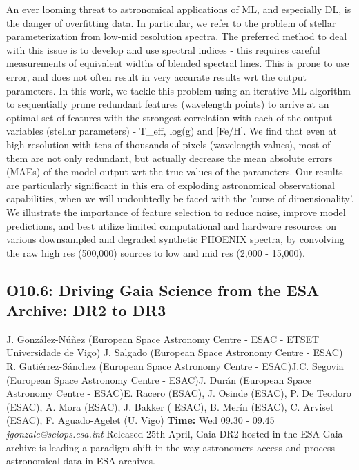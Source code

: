 \documentclass{report}
\begin{document}
An ever looming threat to astronomical applications of ML, and especially DL, is the danger of overfitting data. In particular, we refer to the problem of stellar parameterization from low-mid resolution spectra. The preferred method to deal with this issue is to develop and use spectral indices - this requires careful measurements of equivalent widths of blended spectral lines. This is prone to use error, and does not often result in very accurate results wrt the output parameters. In this work, we tackle this problem using an iterative ML algorithm to sequentially prune redundant features (wavelength points) to arrive at an optimal set of features with the strongest correlation with each of the output variables (stellar parameters) - T\_eff, log(g) and [Fe/H]. We find that even at high resolution with tens of thousands of pixels (wavelength values), most of them are not only redundant, but actually decrease the mean absolute errors (MAEs) of the model output wrt the true values of the parameters. Our results are particularly significant in this era of exploding astronomical observational capabilities, when we will undoubtedly be faced with the 'curse of dimensionality'. We illustrate the importance of feature selection to reduce noise, improve model predictions, and best utilize limited computational and hardware resources on various downsampled and degraded synthetic PHOENIX spectra, by convolving the raw high res (500,000) sources to low and mid res (2,000 - 15,000).\newline
\newpage
\subsection*{O10.6: Driving Gaia Science from the ESA Archive: DR2 to DR3}
\bigskip
J. González-Núñez (European Space Astronomy Centre - ESAC - ETSET Universidade de Vigo) \newline J. Salgado (European Space Astronomy Centre - ESAC) \newline  R. Gutiérrez-Sánchez (European Space Astronomy Centre - ESAC)\newline  J.C. Segovia (European Space Astronomy Centre - ESAC)\newline J. Durán (European Space Astronomy Centre - ESAC)\newline  E. Racero (ESAC), J. Osinde (ESAC), P. De Teodoro (ESAC), A. Mora (ESAC), J. Bakker ( ESAC), B. Merín (ESAC), C. Arviset (ESAC), F. Aguado-Agelet (U. Vigo)\newline\newline
{\bf Time:} Wed 09.30 - 09.45\newline
\newline
{\it jgonzale@sciops.esa.int}\newline
\newline\newline
Released 25th April, Gaia DR2 hosted in the ESA Gaia archive is leading a paradigm shift in the way astronomers access and process astronomical data in ESA archives.
\end{document}

